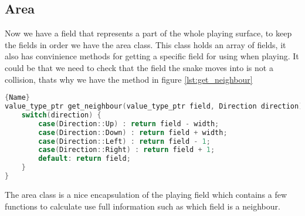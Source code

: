 \subsection{Area}

Now we have a field that represents a part of the whole playing surface, to keep the fields in order we have the area class.
This class holds an array of fields, it also has convinience methods for getting a specific field for using when playing.
It could be that we need to check that the field the snake moves into is not a collision, thats why we have the method in figure \ref{lst:get_neighbour}


\begin{lstlisting}[caption={Getting a neighbour field},label={lst:get_neighbour},frame=tlrb, language=C++]{Name}
value_type_ptr get_neighbour(value_type_ptr field, Direction direction) {
	switch(direction) {
		case(Direction::Up) : return field - width;
		case(Direction::Down) : return field + width;
		case(Direction::Left) : return field - 1;
		case(Direction::Right) : return field + 1;
		default: return field;
	}
}
\end{lstlisting}

The area class is a nice encapsulation of the playing field which contains a few functions to calculate use full information such as which field is a neighbour.